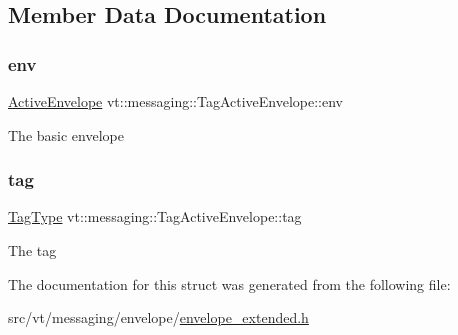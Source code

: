 \subsection{Member Data Documentation}
\mbox{\label{structvt_1_1messaging_1_1_tag_active_envelope_a407d7bb06664c813df052dac889f8f3a}} 
\subsubsection{\texorpdfstring{env}{env}}
{\footnotesize\ttfamily \hyperlink{structvt_1_1messaging_1_1_active_envelope}{Active\+Envelope} vt\+::messaging\+::\+Tag\+Active\+Envelope\+::env}

The basic envelope \mbox{\label{structvt_1_1messaging_1_1_tag_active_envelope_ab5fdfcb898f8e0ca0b5c580018824766}} 
\subsubsection{\texorpdfstring{tag}{tag}}
{\footnotesize\ttfamily \hyperlink{namespacevt_a84ab281dae04a52a4b243d6bf62d0e52}{Tag\+Type} vt\+::messaging\+::\+Tag\+Active\+Envelope\+::tag}

The tag 

The documentation for this struct was generated from the following file\+:\begin{DoxyCompactItemize}
\item 
src/vt/messaging/envelope/\hyperlink{envelope__extended_8h}{envelope\+\_\+extended.\+h}\end{DoxyCompactItemize}
